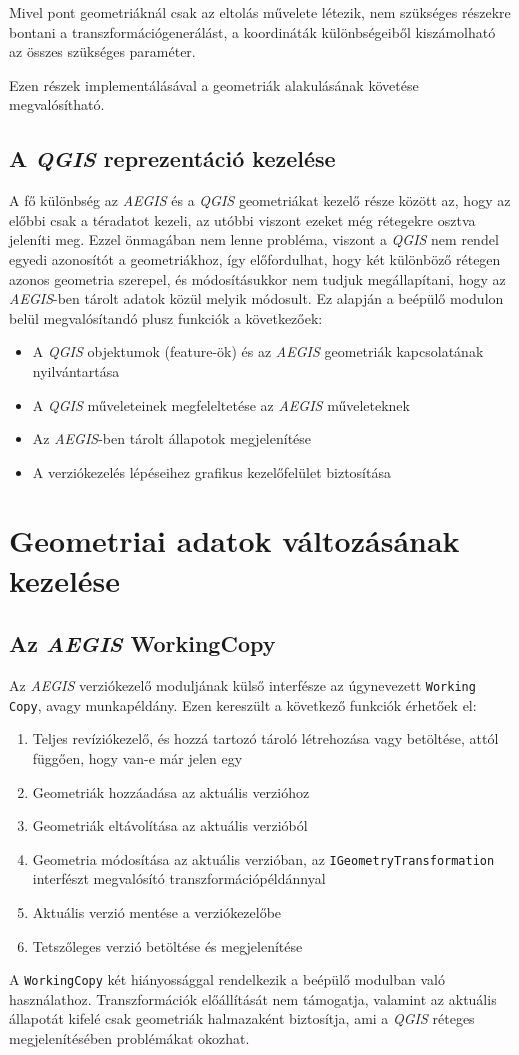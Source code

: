 Mivel pont geometriáknál csak az eltolás művelete létezik, nem szükséges részekre bontani a transzformációgenerálást, a koordináták különbségeiből kiszámolható az összes szükséges paraméter.

Ezen részek implementálásával a geometriák alakulásának követése megvalósítható.

\subsection{A \emph{QGIS} reprezentáció kezelése}
A fő különbség az \emph{AEGIS} és a \emph{QGIS} geometriákat kezelő része között az, hogy az előbbi csak a téradatot kezeli, az utóbbi viszont ezeket még rétegekre osztva jeleníti meg. Ezzel önmagában nem lenne probléma, viszont a \emph{QGIS} nem rendel egyedi azonosítót a geometriákhoz, így előfordulhat, hogy két különböző rétegen azonos geometria szerepel, és módosításukkor nem tudjuk megállapítani, hogy az \emph{AEGIS}-ben tárolt adatok közül melyik módosult. Ez alapján  a beépülő modulon belül megvalósítandó plusz funkciók a következőek:
\begin{itemize}
	\item A \emph{QGIS} objektumok (feature-ök) és az \emph{AEGIS} geometriák kapcsolatának nyilvántartása
	\item A \emph{QGIS} műveleteinek megfeleltetése az \emph{AEGIS} műveleteknek
	\item Az \emph{AEGIS}-ben tárolt állapotok megjelenítése 
	\item A verziókezelés lépéseihez grafikus kezelőfelület biztosítása
\end{itemize}

\section{Geometriai adatok változásának kezelése}
\subsection{Az \emph{AEGIS} WorkingCopy}
Az \emph{AEGIS} verziókezelő moduljának külső interfésze az úgynevezett \texttt{Working Copy}, avagy munkapéldány. Ezen kereszült a következő funkciók érhetőek el:
\begin{enumerate}
	\item Teljes revíziókezelő, és hozzá tartozó tároló létrehozása vagy betöltése, attól függően, hogy van-e már jelen egy
	\item Geometriák hozzáadása az aktuális verzióhoz
	\item Geometriák eltávolítása az aktuális verzióból
	\item Geometria módosítása az aktuális verzióban, az \texttt{IGeometryTransformation} interfészt megvalósító transzformációpéldánnyal
	\item Aktuális verzió mentése a verziókezelőbe
	\item Tetszőleges verzió betöltése és megjelenítése
\end{enumerate}
A \texttt{WorkingCopy} két hiányossággal rendelkezik a beépülő modulban való használathoz. Transzformációk előállítását nem támogatja, valamint az aktuális állapotát kifelé csak geometriák halmazaként biztosítja, ami a \emph{QGIS} réteges megjelenítésében problémákat okozhat.
